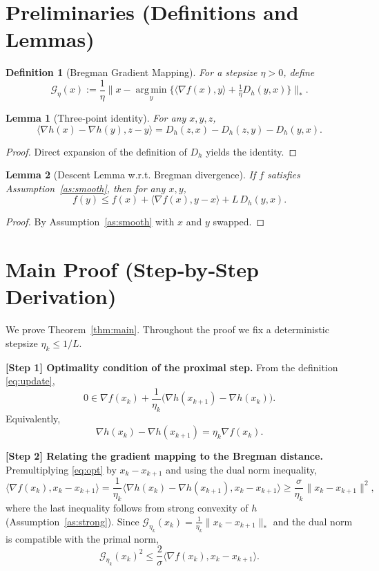 \documentclass{article}
\newtheorem{lemma}{Lemma}
\newtheorem{definition}{Definition}
\newcommand{\argmin}{\operatorname*{arg\,min}}
\newcommand{\grad}{\nabla}
\newcommand{\D}{D_h}
\begin{document}
\newpage
\section*{Preliminaries (Definitions and Lemmas)}
\begin{definition}[Bregman Gradient Mapping]
For a stepsize $\eta>0$, define
\[
\mathcal{G}_{\eta}(x):=\frac{1}{\eta}\bigl\|x-\argmin_{y}\{\langle \grad f(x),y\rangle+\tfrac{1}{\eta}\D(y,x)\}\bigr\|_{*}.
\]
\end{definition}

\begin{lemma}[Three‑point identity]\label{lem:three}
For any $x,y,z$,
\[
\langle \grad h(x)-\grad h(y),z-y\rangle = \D(z,x)-\D(z,y)-\D(y,x).
\]
\end{lemma}
\begin{proof}
Direct expansion of the definition of $\D$ yields the identity. \qedhere
\end{proof}

\begin{lemma}[Descent Lemma w.r.t. Bregman divergence]\label{lem:descent}
If $f$ satisfies Assumption~\ref{as:smooth}, then for any $x,y$,
\[
f(y)\le f(x)+\langle \grad f(x),y-x\rangle+L\,\D(y,x).
\]
\end{lemma}
\begin{proof}
By Assumption~\ref{as:smooth} with $x$ and $y$ swapped. \qedhere
\end{proof}

\section*{Main Proof (Step‑by‑Step Derivation)}
We prove Theorem~\ref{thm:main}. Throughout the proof we fix a deterministic stepsize $\eta_k\le 1/L$.

\noindent\textbf{[Step 1] Optimality condition of the proximal step.}  
From the definition \eqref{eq:update},
\[
0\in \grad f(x_k)+\frac{1}{\eta_k}\bigl(\grad h(x_{k+1})-\grad h(x_k)\bigr).
\]
Equivalently,
\begin{equation}
\grad h(x_k)-\grad h(x_{k+1})=\eta_k \grad f(x_k).
\label{eq:opt}
\end{equation}

\noindent\textbf{[Step 2] Relating the gradient mapping to the Bregman distance.}  
Premultiplying \eqref{eq:opt} by $x_k-x_{k+1}$ and using the dual norm inequality,
\[
\langle \grad f(x_k),x_k-x_{k+1}\rangle =\frac{1}{\eta_k}\langle \grad h(x_k)-\grad h(x_{k+1}),x_k-x_{k+1}\rangle
\ge\frac{\sigma}{\eta_k}\|x_k-x_{k+1}\|^{2},
\]
where the last inequality follows from strong convexity of $h$ (Assumption~\ref{as:strong}).  
Since $\mathcal{G}_{\eta_k}(x_k)=\frac{1}{\eta_k}\|x_k-x_{k+1}\|_{*}$ and the dual norm is compatible with the primal norm,
\begin{equation}
\mathcal{G}_{\eta_k}(x_k)^{2}\le\frac{2}{\sigma}\langle \grad f(x_k),x_k-x_{k+1}\rangle .
\label{eq:gradmap}
\end{equation}
\end{document}
